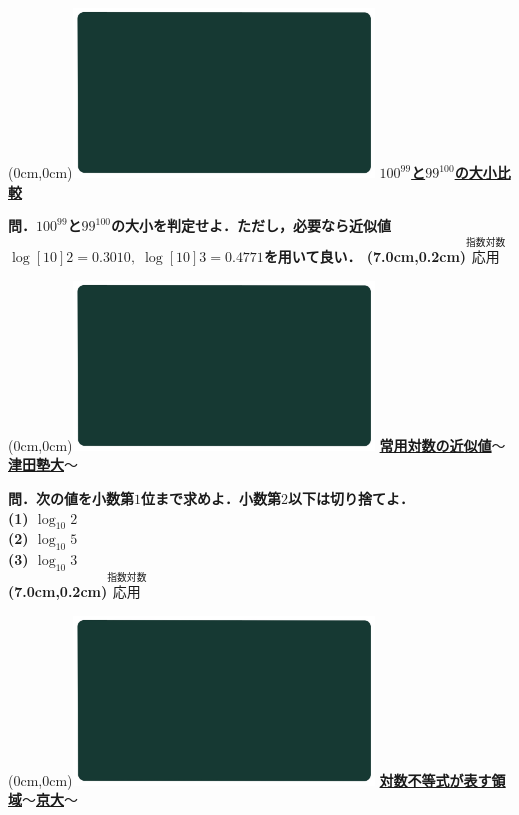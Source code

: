 \documentclass[10pt,
fleqn,
dvipdfmx,
uplatex
]{jsarticle}
\begin{document}
\newpage



\at(0cm,0cm){\includegraphics[width=8cm,bb=0 0 1920 1080]{./youtube/thumbnails/templates/smart_background/指数対数.jpeg}}
{\color{orange}\bf\boldmath\huge\underline{$100^{99}$と$99^{100}$の大小比較}}\vspace{0.3zw}

\LARGE 
\bf\boldmath 問．${100}^{99}$と${99}^{100}$の大小を判定せよ．ただし，必要なら近似値$\log [{10}]2=0.{3010},\;\log [{10}]3=0.{4771}$を用いて良い．
\at(7.0cm,0.2cm){\small\color{bradorange}$\overset{\text{指数対数}}{\text{応用}}$}


\newpage



\at(0cm,0cm){\includegraphics[width=8cm,bb=0 0 1920 1080]{./youtube/thumbnails/templates/smart_background/指数対数.jpeg}}
{\color{orange}\bf\boldmath\Large\underline{常用対数の近似値$〜$津田塾大$〜$}}\vspace{0.3zw}

\Large 
\bf\boldmath 問．次の値を小数第$1$位まで求めよ．小数第$2$以下は切り捨てよ．\\
(1)  $\log _{10}2$\\
(2)  $\log _{10}5$\\
(3)  $\log _{10}3$\\

\at(7.0cm,0.2cm){\small\color{bradorange}$\overset{\text{指数対数}}{\text{応用}}$}


\newpage



\at(0cm,0cm){\includegraphics[width=8cm,bb=0 0 1920 1080]{./youtube/thumbnails/templates/smart_background/指数対数.jpeg}}
{\color{orange}\bf\boldmath\Large\underline{対数不等式が表す領域$〜$京大$〜$}}\vspace{0.3zw}
\end{document}

